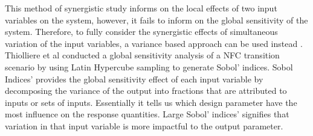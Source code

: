 This method of synergistic study informs on the local effects of 
two input variables on the system, however, it fails to inform 
on the global sensitivity of the system. 
Therefore, to fully consider the synergistic effects of
simultaneous variation of the input variables, a variance 
based approach can be used instead \cite{thiolliere_methodology_2018}.
Thiolliere et al conducted a global sensitivity analysis of a 
\gls{NFC} transition scenario by using Latin Hypercube sampling 
to generate Sobol' indices. 
Sobol Indices' provides the global sensitivity effect of each input 
variable by decomposing the variance of the output into fractions 
that are attributed to inputs or sets of inputs. 
Essentially it tells us which design parameter have the most 
influence on the response quantities. 
Large Sobol' indices' signifies that variation in that 
input variable is more impactful to the output parameter. 
